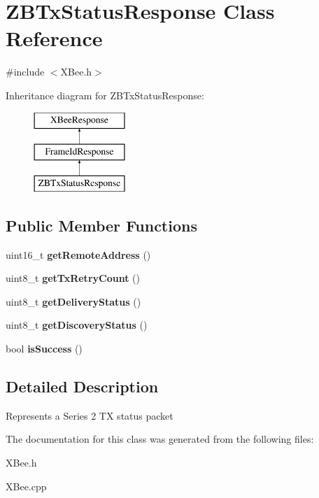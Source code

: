 \hypertarget{classZBTxStatusResponse}{\section{\-Z\-B\-Tx\-Status\-Response \-Class \-Reference}
\label{classZBTxStatusResponse}
}


{\ttfamily \#include $<$\-X\-Bee.\-h$>$}

\-Inheritance diagram for \-Z\-B\-Tx\-Status\-Response\-:\begin{figure}[H]
\begin{center}
\leavevmode
\includegraphics[height=3.000000cm]{classZBTxStatusResponse}
\end{center}
\end{figure}
\subsection*{\-Public \-Member \-Functions}
\begin{DoxyCompactItemize}
\item 
\hypertarget{classZBTxStatusResponse_a75043a3c9af5868938de65c2e4eb1196}{uint16\-\_\-t {\bfseries get\-Remote\-Address} ()}\label{classZBTxStatusResponse_a75043a3c9af5868938de65c2e4eb1196}

\item 
\hypertarget{classZBTxStatusResponse_a84f24560187b275d171f0abca28fe2a4}{uint8\-\_\-t {\bfseries get\-Tx\-Retry\-Count} ()}\label{classZBTxStatusResponse_a84f24560187b275d171f0abca28fe2a4}

\item 
\hypertarget{classZBTxStatusResponse_ad5b8d8a178e0f8fb69e7f24999c37a26}{uint8\-\_\-t {\bfseries get\-Delivery\-Status} ()}\label{classZBTxStatusResponse_ad5b8d8a178e0f8fb69e7f24999c37a26}

\item 
\hypertarget{classZBTxStatusResponse_a0a0a3e30c844a032b43e71f2cdcd66b8}{uint8\-\_\-t {\bfseries get\-Discovery\-Status} ()}\label{classZBTxStatusResponse_a0a0a3e30c844a032b43e71f2cdcd66b8}

\item 
\hypertarget{classZBTxStatusResponse_a3e8472bdc5c2a91a352c75ab327dcccc}{bool {\bfseries is\-Success} ()}\label{classZBTxStatusResponse_a3e8472bdc5c2a91a352c75ab327dcccc}

\end{DoxyCompactItemize}


\subsection{\-Detailed \-Description}
\-Represents a \-Series 2 \-T\-X status packet 

\-The documentation for this class was generated from the following files\-:\begin{DoxyCompactItemize}
\item 
\-X\-Bee.\-h\item 
\-X\-Bee.\-cpp\end{DoxyCompactItemize}
